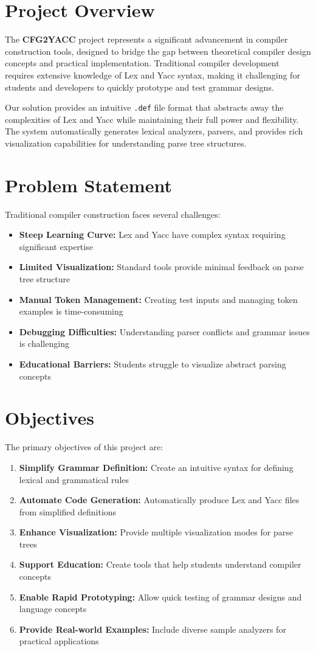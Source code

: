 \documentclass[a4paper,12pt]{report}
\begin{document}
\section{Project Overview}
The \textbf{CFG2YACC} project represents a significant advancement in compiler construction tools, designed to bridge the gap between theoretical compiler design concepts and practical implementation. Traditional compiler development requires extensive knowledge of Lex and Yacc syntax, making it challenging for students and developers to quickly prototype and test grammar designs.

Our solution provides an intuitive \texttt{.def} file format that abstracts away the complexities of Lex and Yacc while maintaining their full power and flexibility. The system automatically generates lexical analyzers, parsers, and provides rich visualization capabilities for understanding parse tree structures.

\section{Problem Statement}
Traditional compiler construction faces several challenges:
\begin{itemize}
    \item \textbf{Steep Learning Curve:} Lex and Yacc have complex syntax requiring significant expertise
    \item \textbf{Limited Visualization:} Standard tools provide minimal feedback on parse tree structure
    \item \textbf{Manual Token Management:} Creating test inputs and managing token examples is time-consuming
    \item \textbf{Debugging Difficulties:} Understanding parser conflicts and grammar issues is challenging
    \item \textbf{Educational Barriers:} Students struggle to visualize abstract parsing concepts
\end{itemize}

\section{Objectives}
The primary objectives of this project are:
\begin{enumerate}
    \item \textbf{Simplify Grammar Definition:} Create an intuitive syntax for defining lexical and grammatical rules
    \item \textbf{Automate Code Generation:} Automatically produce Lex and Yacc files from simplified definitions
    \item \textbf{Enhance Visualization:} Provide multiple visualization modes for parse trees
    \item \textbf{Support Education:} Create tools that help students understand compiler concepts
    \item \textbf{Enable Rapid Prototyping:} Allow quick testing of grammar designs and language concepts
    \item \textbf{Provide Real-world Examples:} Include diverse sample analyzers for practical applications
\end{enumerate}
\end{document}
